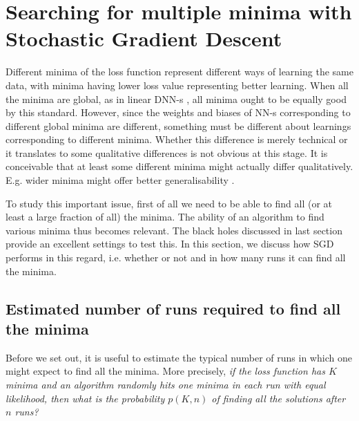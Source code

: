\documentclass[12pt,a4paper]{JHEP3}
\begin{document}
\section{Searching for multiple minima with Stochastic  Gradient Descent} \label{s4}
Different minima of the loss function represent different ways of learning the same data, with minima having lower loss value representing better learning. When all the minima are global, as in linear DNN-s \cite{kawaguchi2016deep}, all minima ought to be equally good by this standard. However, since the weights and biases of NN-s corresponding to different global minima are different, something must be different about learnings corresponding to different minima. 
Whether this difference is merely technical or it translates to some qualitative differences is not obvious at this stage. It is conceivable that at least some different minima might actually differ qualitatively. E.g. wider minima might offer better generalisability \cite{NIPS1994_01882513, chaudhari2017entropysgd, keskar2017largebatch}.

To study this important issue, first of all we need to be able to find all (or at least a large fraction of all) the minima. 
The ability of an algorithm to find various minima thus becomes relevant. 
The black holes discussed in last section provide an excellent settings to test this.
In this section, we discuss how  SGD performs in this regard, i.e. whether or not and in how many runs it can find all the minima. 
\subsection{Estimated number of runs required to find all the minima}
Before we set out, it is useful to estimate the typical number of runs in which one might expect to find all the minima. More precisely, 
\textit{ if the loss function has $K$ minima and an algorithm randomly  hits one minima in each run with equal likelihood, then what is the probability $p(K,n)$ of finding all the solutions after $n$ runs?}
\end{document}
